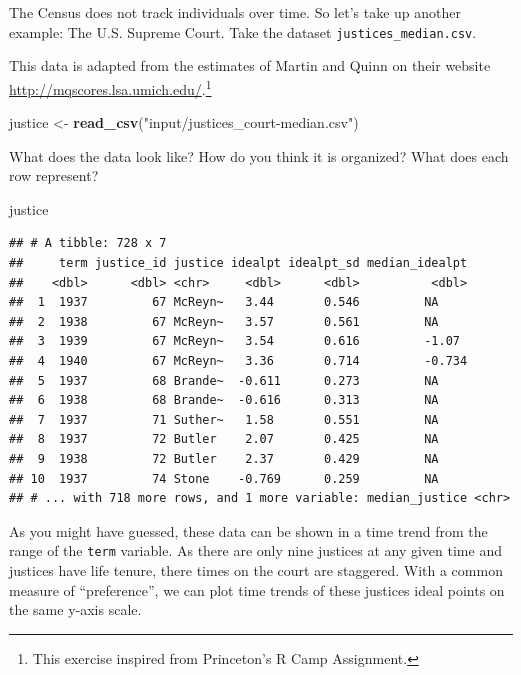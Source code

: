 \documentclass[]{book}
\newenvironment{Shaded}{\begin{snugshade}}{\end{snugshade}}
\newcommand{\KeywordTok}[1]{\textcolor[rgb]{0.13,0.29,0.53}{\textbf{#1}}}
\newcommand{\NormalTok}[1]{#1}
\newcommand{\StringTok}[1]{\textcolor[rgb]{0.31,0.60,0.02}{#1}}
\let\rmarkdownfootnote\footnote%
\def\footnote{\protect\rmarkdownfootnote}
\theoremstyle{definition}
\theoremstyle{definition}
\theoremstyle{definition}
\theoremstyle{remark}
\begin{document}
The Census does not track individuals over time. So let's take up another example: The U.S. Supreme Court. Take the dataset \texttt{justices\_median.csv}.

This data is adapted from the estimates of Martin and Quinn on their website \url{http://mqscores.lsa.umich.edu/}.\footnote{This exercise inspired from Princeton's R Camp Assignment.}

\begin{Shaded}
\begin{Highlighting}[]
\NormalTok{justice <-}\StringTok{ }\KeywordTok{read_csv}\NormalTok{(}\StringTok{"input/justices_court-median.csv"}\NormalTok{)}
\end{Highlighting}
\end{Shaded}

What does the data look like? How do you think it is organized? What does each row represent?

\begin{Shaded}
\begin{Highlighting}[]
\NormalTok{justice}
\end{Highlighting}
\end{Shaded}

\begin{verbatim}
## # A tibble: 728 x 7
##     term justice_id justice idealpt idealpt_sd median_idealpt
##    <dbl>      <dbl> <chr>     <dbl>      <dbl>          <dbl>
##  1  1937         67 McReyn~   3.44       0.546         NA    
##  2  1938         67 McReyn~   3.57       0.561         NA    
##  3  1939         67 McReyn~   3.54       0.616         -1.07 
##  4  1940         67 McReyn~   3.36       0.714         -0.734
##  5  1937         68 Brande~  -0.611      0.273         NA    
##  6  1938         68 Brande~  -0.616      0.313         NA    
##  7  1937         71 Suther~   1.58       0.551         NA    
##  8  1937         72 Butler    2.07       0.425         NA    
##  9  1938         72 Butler    2.37       0.429         NA    
## 10  1937         74 Stone    -0.769      0.259         NA    
## # ... with 718 more rows, and 1 more variable: median_justice <chr>
\end{verbatim}

As you might have guessed, these data can be shown in a time trend from the range of the \texttt{term} variable. As there are only nine justices at any given time and justices have life tenure, there times on the court are staggered. With a common measure of ``preference'', we can plot time trends of these justices ideal points on the same y-axis scale.
\end{document}

